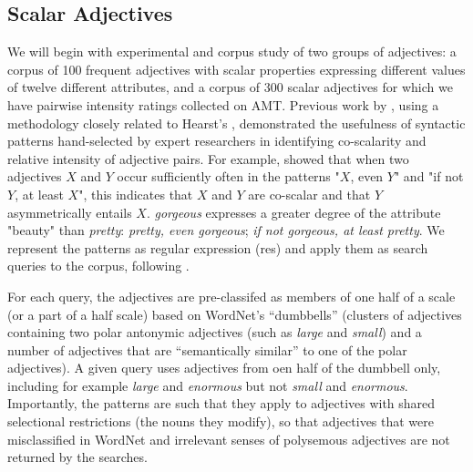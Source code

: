 \documentclass[10pt]{article}
\begin{document}


\vspace{-.1in}
\subsection{\label{scalar}Scalar Adjectives}
We will begin with experimental and corpus study of two groups of adjectives: a corpus of  100 frequent adjectives with scalar properties expressing different values of twelve different attributes, and a corpus of 300 scalar adjectives for which we have pairwise intensity ratings collected on AMT. 
 Previous work by \cite{sheinmanetal2013,sheinman2009adjscales}, using a methodology closely related to Hearst's \cite{hearst1992automatic}, demonstrated the usefulness of syntactic patterns hand-selected by expert researchers in identifying co-scalarity and relative intensity of adjective pairs. 
For example, \cite{sheinmanetal2013} showed that when two adjectives $X$ and $Y$ occur sufficiently often in the patterns "$X$, even $Y$" and "if not $Y$, at least $X$", this indicates that $X$ and $Y$ are co-scalar and that $Y$ asymmetrically entails $X$. 
%
%
 \emph{gorgeous} expresses  a greater degree 
of the attribute "beauty" than \emph{pretty}:  \emph{pretty, even gorgeous}; \emph{if not gorgeous, at least 
pretty}. 
We represent the patterns as regular expression ({\sc re}s) and apply them as search queries to the corpus, following \cite{sheinman2009adjscales}.
 
For each query, the adjectives are pre-classifed as members of one half of a scale (or a part of a half scale) based on WordNet's ``dumbbells'' (clusters of adjectives containing two polar antonymic adjectives (such as \emph{large} and \emph{small}) and a number of adjectives that are ``semantically similar'' to one of the polar adjectives). 
A given query uses adjectives from oen half of the dumbbell only, including for example 
\textit{large} and \textit{enormous} but not \textit{small} and \textit{enormous}. Importantly, the patterns 
are such that they apply to adjectives with shared selectional restrictions (the nouns they modify), 
so that adjectives that  were misclassified in WordNet and irrelevant senses of polysemous adjectives 
are not returned by the searches. 
\end{document}

